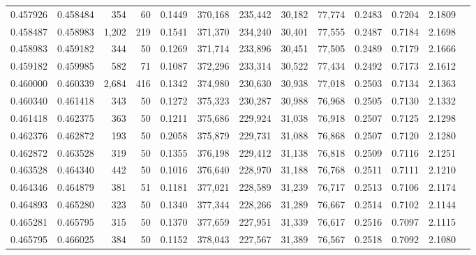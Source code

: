 \begin{tabular}{rrrrrrrrrrrrr}
0.457926 & 0.458484 &   354 &  60 &                                     0.1449 & 370,168 & 235,442 &  30,182 &  77,774 & 0.2483 & 0.7204 & 2.1809 \\
0.458487 & 0.458983 & 1,202 & 219 &                                     0.1541 & 371,370 & 234,240 &  30,401 &  77,555 & 0.2487 & 0.7184 & 2.1698 \\
0.458983 & 0.459182 &   344 &  50 &                                     0.1269 & 371,714 & 233,896 &  30,451 &  77,505 & 0.2489 & 0.7179 & 2.1666 \\
0.459182 & 0.459985 &   582 &  71 &                                     0.1087 & 372,296 & 233,314 &  30,522 &  77,434 & 0.2492 & 0.7173 & 2.1612 \\
0.460000 & 0.460339 & 2,684 & 416 &                                     0.1342 & 374,980 & 230,630 &  30,938 &  77,018 & 0.2503 & 0.7134 & 2.1363 \\
0.460340 & 0.461418 &   343 &  50 &                                     0.1272 & 375,323 & 230,287 &  30,988 &  76,968 & 0.2505 & 0.7130 & 2.1332 \\
0.461418 & 0.462375 &   363 &  50 &                                     0.1211 & 375,686 & 229,924 &  31,038 &  76,918 & 0.2507 & 0.7125 & 2.1298 \\
0.462376 & 0.462872 &   193 &  50 &                                     0.2058 & 375,879 & 229,731 &  31,088 &  76,868 & 0.2507 & 0.7120 & 2.1280 \\
0.462872 & 0.463528 &   319 &  50 &                                     0.1355 & 376,198 & 229,412 &  31,138 &  76,818 & 0.2509 & 0.7116 & 2.1251 \\
0.463528 & 0.464340 &   442 &  50 &                                     0.1016 & 376,640 & 228,970 &  31,188 &  76,768 & 0.2511 & 0.7111 & 2.1210 \\
0.464346 & 0.464879 &   381 &  51 &                                     0.1181 & 377,021 & 228,589 &  31,239 &  76,717 & 0.2513 & 0.7106 & 2.1174 \\
0.464893 & 0.465280 &   323 &  50 &                                     0.1340 & 377,344 & 228,266 &  31,289 &  76,667 & 0.2514 & 0.7102 & 2.1144 \\
0.465281 & 0.465795 &   315 &  50 &                                     0.1370 & 377,659 & 227,951 &  31,339 &  76,617 & 0.2516 & 0.7097 & 2.1115 \\
0.465795 & 0.466025 &   384 &  50 &                                     0.1152 & 378,043 & 227,567 &  31,389 &  76,567 & 0.2518 & 0.7092 & 2.1080 \\

\end{tabular}
